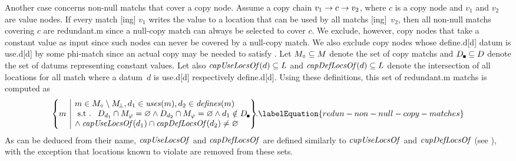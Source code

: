 Another case concerns non-\glspl{null match} that cover a \gls{copy node}.
%
Assume a copy chain \mbox{$v_1 \rightarrow c \rightarrow v_2$}, where $c$ is a
\gls{copy node} and $v_1$ and $v_2$ are \glspl{value node}.
%
If every \gls{match} [ing] $v_1$ writes the value to a
\gls{location} that can be used by all \glspl{match}
[ing]~$v_2$, then all non-\glspl{null match} covering $c$ are
\gls{redundant.m} since a \gls{null-copy match} can always be selected to cover
$c$.
%
We exclude, however, \glspl{copy node} that take a constant value as input since
such \glspl{node} can never be covered by a \gls{null-copy match}.
%
We also exclude \glspl{copy node} whose \gls{define.d}[d] \gls{datum} is
\gls{use.d}[d] by some \gls{phi-match} since an actual copy may be needed to
satisfy .
%
Let \mbox{$\mCopyMatchSet \subseteq \mMatchSet$} denote the set of \glspl{copy
  match} and \mbox{$\mConstDataSet \subseteq \mDataSet$} denote the set of
\glspl{datum} representing constant values.
%
Let also \mbox{$\operatorname{\textrm{\textit{capUseLocsOf}}}(d) \subseteq L$} and
\mbox{$\operatorname{\textrm{\textit{capDefLocsOf}}}(d) \subseteq L$} denote the intersection of
all \glspl{location} for all \gls{match} where a \gls{datum}~$d$ is
\gls{use.d}[d] respectively \gls{define.d}[d].
%
Using these definitions, this set of \gls{redundant.m} \glspl{match} is computed as
%
\begin{equation}
  \mSetBuilder*{m}%
               {%
                 \begin{array}{@{}l@{}}
                   m \in \mCopyMatchSet \setminus \mNullMatchSet,
                   d_1 \in \mUses(m),
                   d_2 \in \mDefines(m) \\
                   \text{\st }
                   \mDataSet[d_1] \cap \mPhiMatchSet = \mEmptySet
                   \mAnd
                   \mDataSet[d_2] \cap \mPhiMatchSet = \mEmptySet
                   \mAnd
                   d_1 \notin \mConstDataSet \\
                   \mbox{}\hspace{-2pt} \mAnd
                   \mCapUseLocsOf(d_1) \cap \mCapDefLocsOf(d_2) \neq \mEmptySet
                 \end{array}
               }\!\!.
  \labelEquation{redun-non-null-copy-matches}
\end{equation}
%
As can be deduced from their name, $\operatorname{\textrm{\textit{capUseLocsOf}}}$ and $\operatorname{\textrm{\textit{capDefLocsOf}}}$ are
defined similarly to $\operatorname{\textrm{\textit{cupUseLocsOf}}}$ and $\operatorname{\textrm{\textit{cupDefLocsOf}}}$ (see
), with the
exception that \glspl{location} known to violate
 are removed from these sets.



